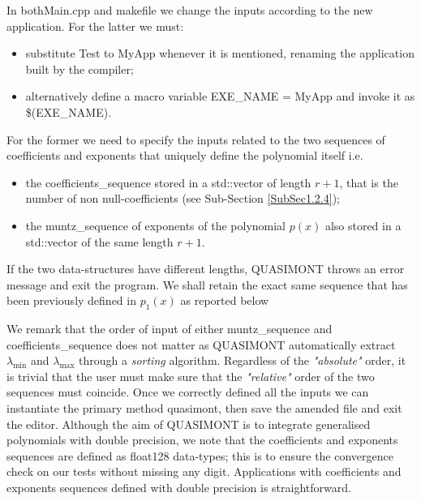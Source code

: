 \documentclass[a4paper, twosided]{book}
\begin{document}
\noindent
In both\colorbox{poliGrayBlue}{Main.cpp} and  \colorbox{poliGrayBlue}{makefile} we change the inputs according to the new application. For the latter we must:

\begin{itemize}
    \item substitute \colorbox{poliGrayBlue}{Test} to \colorbox{poliGrayBlue}{MyApp} whenever it is mentioned, renaming the application built by the compiler;
    \item alternatively define a macro variable \colorbox{poliGrayBlue}{EXE\_NAME = MyApp} and invoke it as \colorbox{poliGrayBlue}{\$(EXE\_NAME)}.
\end{itemize}

\noindent
For the former we need to specify the inputs related to the two sequences of coefficients and exponents that uniquely define the polynomial itself i.e.

\begin{itemize}
    \item the \colorbox{poliGrayBlue}{coefficients\_sequence} stored in a \colorbox{poliGrayBlue}{std::vector} of length $r+1$, that is the number of non null-coefficients (see Sub-Section \ref{SubSec1.2.4});
    \item the \colorbox{poliGrayBlue}{muntz\_sequence} of exponents of the polynomial $p(x)$ also stored in a \colorbox{poliGrayBlue}{std::vector} of the same length $r+1$.
\end{itemize}

\noindent
If the two data-structures have different lengths, QUASIMONT throws an error message and exit the program. We shall retain the exact same sequence that has been previously defined in $p_1(x)$ as reported below

\vspace{0.2cm}
\vspace{0.3cm}

\noindent
We remark that the order of input of either \colorbox{poliGrayBlue}{muntz\_sequence} and \colorbox{poliGrayBlue}{coefficients\_sequence} does not matter as QUASIMONT automatically extract $\lambda_{\text{min}}$ and $\lambda_{\text{max}}$ through a \textsl{sorting} algorithm. Regardless of the \textsl{"absolute"} order, it is trivial that the user must make sure that the \textsl{"relative"} order of the two sequences must coincide. Once we correctly defined all the inputs we can instantiate the primary method \colorbox{poliGrayBlue}{quasimont}, then save the amended file and exit the editor. Although the aim of QUASIMONT is to integrate generalised polynomials with double precision, we note that the coefficients and exponents sequences are defined as \colorbox{poliGrayBlue}{float128} data-types; this is to ensure the convergence check on our tests without missing any digit. Applications with coefficients and exponents sequences defined with double precision is straightforward.
\end{document}
